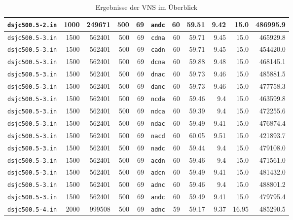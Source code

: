 \begin{table}[!htbp]
\begin{tabular}{c|rrr|r|c|rrr|r|r}
\texttt{dsjc500.5-2.in}	& 1000	& 249671	& 500	& 69	& \texttt{andc}	& 60	& 59.51	& 9.42	& 15.0	& 486995.9\\
\hline
\texttt{dsjc500.5-3.in}	& 1500	& 562401	& 500	& 69	& \texttt{cdna}	& 60	& 59.71	& 9.45	& 15.0	& 465929.8\\
\texttt{dsjc500.5-3.in}	& 1500	& 562401	& 500	& 69	& \texttt{cadn}	& 60	& 59.71	& 9.45	& 15.0	& 454420.0\\
\texttt{dsjc500.5-3.in}	& 1500	& 562401	& 500	& 69	& \texttt{dcna}	& 60	& 59.88	& 9.48	& 15.0	& 468145.1\\
\texttt{dsjc500.5-3.in}	& 1500	& 562401	& 500	& 69	& \texttt{dnac}	& 60	& 59.73	& 9.46	& 15.0	& 485881.5\\
\texttt{dsjc500.5-3.in}	& 1500	& 562401	& 500	& 69	& \texttt{danc}	& 60	& 59.73	& 9.46	& 15.0	& 477758.3\\
\texttt{dsjc500.5-3.in}	& 1500	& 562401	& 500	& 69	& \texttt{ncda}	& 60	& 59.46	& 9.4	& 15.0	& 463599.8\\
\texttt{dsjc500.5-3.in}	& 1500	& 562401	& 500	& 69	& \texttt{ndca}	& 60	& 59.39	& 9.4	& 15.0	& 472255.6\\
\texttt{dsjc500.5-3.in}	& 1500	& 562401	& 500	& 69	& \texttt{ndac}	& 60	& 59.49	& 9.41	& 15.0	& 476874.4\\
\texttt{dsjc500.5-3.in}	& 1500	& 562401	& 500	& 69	& \texttt{nacd}	& 60	& 60.05	& 9.51	& 15.0	& 421893.7\\
\texttt{dsjc500.5-3.in}	& 1500	& 562401	& 500	& 69	& \texttt{nadc}	& 60	& 59.44	& 9.4	& 15.0	& 479108.0\\
\texttt{dsjc500.5-3.in}	& 1500	& 562401	& 500	& 69	& \texttt{acdn}	& 60	& 59.46	& 9.4	& 15.0	& 471561.0\\
\texttt{dsjc500.5-3.in}	& 1500	& 562401	& 500	& 69	& \texttt{adcn}	& 60	& 59.49	& 9.41	& 15.0	& 481432.0\\
\texttt{dsjc500.5-3.in}	& 1500	& 562401	& 500	& 69	& \texttt{adnc}	& 60	& 59.46	& 9.4	& 15.0	& 488801.2\\
\texttt{dsjc500.5-3.in}	& 1500	& 562401	& 500	& 69	& \texttt{andc}	& 60	& 59.49	& 9.41	& 15.0	& 479795.4\\
\hline
\texttt{dsjc500.5-4.in}	& 2000	& 999508	& 500	& 69	& \texttt{adnc}	& 59	& 59.17	& 9.37	& 16.95	& 485290.5\\

\end{tabular}
\caption{Ergebnisse der VNS im Überblick}
\label{tab:result}
\end{table}
